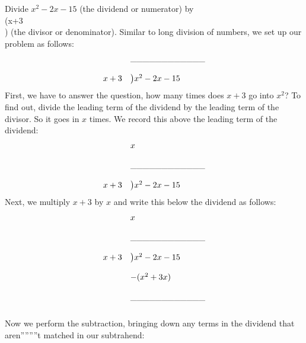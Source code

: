 Divide $x^2-2x-15$ (the dividend or numerator) by \\(x+3\\) (the divisor or denominator). Similar to long division of numbers, we set up our problem as follows:
$$
\begin{array}{rl}
         &       \text{\textunderscore\textunderscore\textunderscore\textunderscore\textunderscore\textunderscore\textunderscore\textunderscore\textunderscore\textunderscore\textunderscore\textunderscore}  \\\\
   x + 3 & \big) x^2-2x-15
\end{array}
$$
First, we have to answer the question, how many times does \(x+3\) go into \(x^2\)? To find out, divide the leading term of the dividend by the leading term of the divisor. So it goes in \(x\) times. We record this above the leading term of the dividend:
$$
\begin{array}{rl}
         &       x   \\\\
         &       \text{\textunderscore\textunderscore\textunderscore\textunderscore\textunderscore\textunderscore\textunderscore\textunderscore\textunderscore\textunderscore\textunderscore\textunderscore}  \\\\
   x + 3 & \big) x^2-2x-15
\end{array}
$$
Next, we multiply \(x+3\) by \(x\) and write this below the dividend as follows:
$$
\begin{array}{rl}
         &       x   \\\\
         &       \text{\textunderscore\textunderscore\textunderscore\textunderscore\textunderscore\textunderscore\textunderscore\textunderscore\textunderscore\textunderscore\textunderscore\textunderscore}  \\\\
   x + 3 & \big) x^2-2x-15 \\\\
         & -(x^2+3x)   \\\\
         &       \text{\textunderscore\textunderscore\textunderscore\textunderscore\textunderscore\textunderscore\textunderscore\textunderscore\textunderscore\textunderscore\textunderscore\textunderscore}  \\\\
\end{array}
$$
Now we perform the subtraction, bringing down any terms in the dividend that aren''''''''t matched in our subtrahend:
